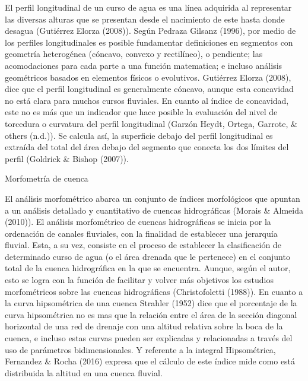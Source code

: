 \documentclass[11pt,]{article}
\begin{document}
El perfil longitudinal de un curso de agua es una línea adquirida al
representar las diversas alturas que se presentan desde el nacimiento de
este hasta donde desagua (Gutiérrez Elorza (2008)). Según Pedraza
Gilsanz (1996), por medio de los perfiles longitudinales es posible
fundamentar definiciones en segmentos con geometría heterogénea
(cóncavo, convexo y rectilíneo), o pendiente; las acomodaciones para
cada parte a una función matematica; e incluso análisis geométricos
basados en elementos físicos o evolutivos. Gutiérrez Elorza (2008), dice
que el perfil longitudinal es generalmente cóncavo, aunque esta
concavidad no está clara para muchos cursos fluviales. En cuanto al
índice de concavidad, este no es más que un indicador que hace posible
la evaluación del nivel de torcedura o curvatura del perfil longitudinal
(Garzón Heydt, Ortega, Garrote, \& others (n.d.)). Se calcula así, la
superficie debajo del perfil longitudinal es extraída del total del área
debajo del segmento que conecta los dos límites del perfil (Goldrick \&
Bishop (2007)).

Morfometría de cuenca

El análisis morfométrico abarca un conjunto de índices morfológicos que
apuntan a un análisis detallado y cuantitativo de cuencas hidrográficas
(Morais \& Almeida (2010)). El análisis morfométrico de cuencas
hidrográficas se inicia por la ordenación de canales fluviales, con la
finalidad de establecer una jerarquía fluvial. Esta, a su vez, consiste
en el proceso de establecer la clasificación de determinado curso de
agua (o el área drenada que le pertenece) en el conjunto total de la
cuenca hidrográfica en la que se encuentra. Aunque, según el autor, esto
se logra con la función de facilitar y volver más objetivos los estudios
morfométricos sobre las cuencas hidrográficas (Christofoletti (1988)).
En cuanto a la curva hipsométrica de una cuenca Strahler (1952) dice que
el porcentaje de la curva hipsométrica no es mas que la relación entre
el área de la sección diagonal horizontal de una red de drenaje con una
altitud relativa sobre la boca de la cuenca, e incluso estas curvas
pueden ser explicadas y relacionadas a través del uso de parámetros
bidimensionales. Y referente a la integral Hipsométrica, Fernandez \&
Rocha (2016) expresa que el cálculo de este índice mide como está
distribuida la altitud en una cuenca fluvial.
\end{document}
